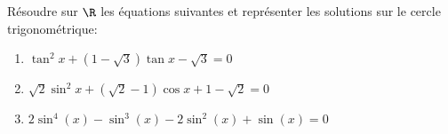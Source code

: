 
\begin{exercice}  \;
R\'esoudre sur $\R$ les \'equations suivantes et repr\'esenter les solutions sur le cercle trigonom\'etrique:
\begin{enumerate}
\item $\tan^2{x}+(1-\sqrt{3})\tan{x}-\sqrt{3}=0$
\item $\sqrt{2}\sin^2{x}+(\sqrt{2}-1)\cos{x}+1-\sqrt{2}=0$
\item $2\sin^4{(x)}-\sin^3{(x)}-2\sin^2{(x)}+\sin{(x)}=0$
\end{enumerate}
\end{exercice}